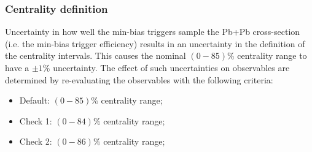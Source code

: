 \subsubsection{Centrality definition}
\label{sec:centrality_definition}

Uncertainty in how well the min-bias triggers sample the Pb+Pb cross-section (i.e. the min-bias trigger efficiency) results in an uncertainty in the definition of the centrality intervals. This causes the nominal $(0-85)\%$ centrality range to have a $\pm 1\%$ uncertainty. The effect of such uncertainties on observables are determined by re-evaluating the observables with the following criteria:
\begin{itemize}
\item Default: $(0-85)\%$ centrality range;
\item Check 1: $(0-84)\%$ centrality range;
\item Check 2: $(0-86)\%$ centrality range;
\end{itemize}

